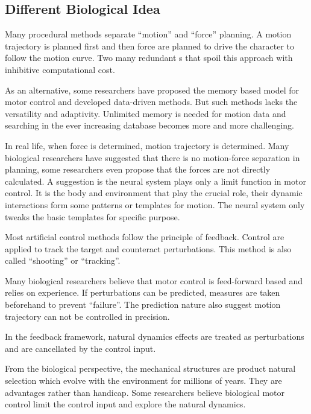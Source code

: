 \subsection{Different Biological Idea}
\begin{itemize}
Many procedural \cms methods separate ``motion'' and ``force''  planning.
A motion trajectory is planned first and then force are planned to drive the character to follow the motion curve.
Two many redundant {\dof}s that spoil this approach  with inhibitive computational cost.

As an alternative, some researchers have proposed the memory based model for motor control and developed data-driven methods.
But such methods lacks the versatility and adaptivity.
Unlimited memory is needed for motion data  and searching in the ever increasing database becomes more and more challenging.



In real life, when force is determined, motion trajectory is determined.
Many biological researchers have suggested that there is no motion-force separation in planning,
some researchers even  propose that the forces are not directly calculated.
A suggestion is  the neural system plays only a limit function in motor control.
It is the body and environment that play the crucial role, their dynamic interactions form some  patterns or templates for motion.
The neural system only tweaks the basic templates for specific purpose.



 
 
	
Most artificial control methods follow the principle of feedback.
Control are applied to track the target and counteract perturbations.
This method is also called ``shooting'' or ``tracking''.


Many  biological researchers believe that motor control is feed-forward based and relies on experience.
If perturbations can be predicted, measures are taken beforehand to prevent ``failure''.
The prediction nature also suggest motion trajectory can not be controlled in precision.
 


In the feedback framework, natural dynamics effects are treated as perturbations and are cancellated by the control input.

From the biological perspective, the mechanical structures are product natural selection which evolve with the environment for millions of years. 
They are advantages rather than handicap. 
Some researchers believe biological motor control limit the control input and explore the natural dynamics.
\end{itemize}


